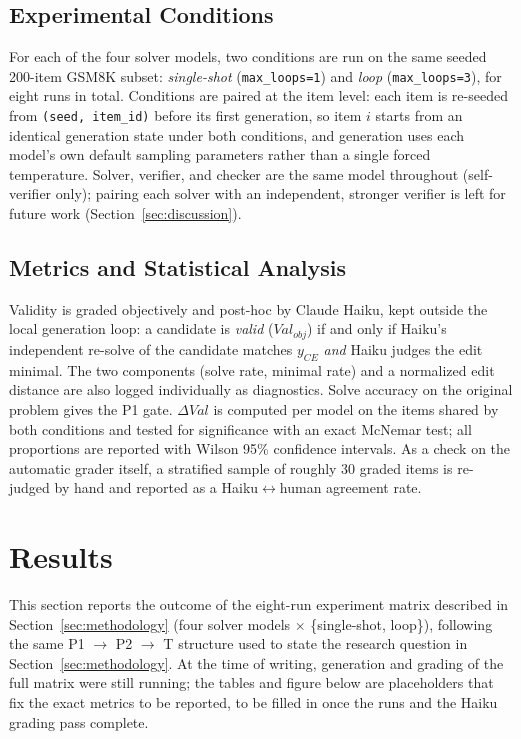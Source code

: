 \documentclass[twoside,twocolumn,10pt]{article}
\begin{document}
\subsection{Experimental Conditions}
For each of the four solver models, two conditions are run on the same seeded 200-item GSM8K subset: \textit{single-shot} (\texttt{max\_loops=1}) and \textit{loop} (\texttt{max\_loops=3}), for eight runs in total. Conditions are paired at the item level: each item is re-seeded from \texttt{(seed, item\_id)} before its first generation, so item $i$ starts from an identical generation state under both conditions, and generation uses each model's own default sampling parameters rather than a single forced temperature. Solver, verifier, and checker are the same model throughout (self-verifier only); pairing each solver with an independent, stronger verifier is left for future work (Section~\ref{sec:discussion}).

\subsection{Metrics and Statistical Analysis}
\label{sec:metrics}
Validity is graded objectively and post-hoc by Claude Haiku, kept outside the local generation loop: a candidate is \textit{valid} ($Val_{obj}$) if and only if Haiku's independent re-solve of the candidate matches $y_{CE}$ \textit{and} Haiku judges the edit minimal. The two components (solve rate, minimal rate) and a normalized edit distance are also logged individually as diagnostics. Solve accuracy on the original problem gives the P1 gate. $\Delta Val$ is computed per model on the items shared by both conditions and tested for significance with an exact McNemar test; all proportions are reported with Wilson 95\% confidence intervals. As a check on the automatic grader itself, a stratified sample of roughly 30 graded items is re-judged by hand and reported as a Haiku$\leftrightarrow$human agreement rate.

\section{Results}
\label{sec:results}
\fontsize{11}{13}\selectfont
This section reports the outcome of the eight-run experiment matrix described in Section~\ref{sec:methodology} (four solver models $\times$ \{single-shot, loop\}), following the same P1 $\to$ P2 $\to$ T structure used to state the research question in Section~\ref{sec:methodology}. At the time of writing, generation and grading of the full matrix were still running; the tables and figure below are placeholders that fix the exact metrics to be reported, to be filled in once the runs and the Haiku grading pass complete.
\end{document}
